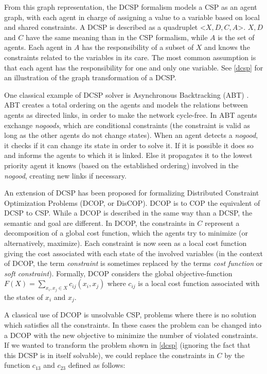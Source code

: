 From this graph representation, the DCSP formalism models a CSP as an agent graph, with each agent in charge of assigning a value to a variable based on local and shared constraints. A DCSP is described as a quadruplet <$X, D, C, A$>. $X, D$ and $C$ have the same meaning than in the CSP formalism, while $A$ is the set of agents. Each agent in $A$ has the responsibility of a subset of $X$ and knows the constraints related to the variables in its care. The most common assumption is that each agent has the responsibility for one and only one variable. See \figurename{} \ref{dcsp} for an illustration of the graph transformation of a DCSP.

One classical example of DCSP solver is Asynchronous Backtracking (ABT) \cite{Yokoo:2001:DCS:380145}. ABT creates a total ordering on the agents and models the relations between agents as directed links, in order to make the network cycle-free. In ABT agents exchange \emph{nogoods}, which are conditional constraints (the constraint is valid as long as the other agents do not change states). When an agent detects a \emph{nogood}, it checks if it can change its state in order to solve it. If it is possible it does so and informs the agents to which it is linked. Else it propagates it to the lowest priority agent it knows (based on the established ordering) involved in the \emph{nogood}, creating new links if necessary.

An extension of DCSP has been proposed for formalizing Distributed Constraint Optimization Problems (DCOP, or DisCOP). DCOP is to COP the equivalent of DCSP to CSP. While a DCOP is described in the same way than a DCSP, the semantic and goal are different.
In DCOP, the constraints in $C$ represent a decomposition of a global cost function, which the agents try to minimize (or alternatively, maximize). Each constraint is now seen as a local cost function giving the cost associated with each state of the involved variables (in the context of DCOP, the term \emph{constraint} is sometimes replaced by the terms \emph{cost function} or \emph{soft constraint}). Formally, DCOP considers the global objective-function $F(X) = \displaystyle\sum_{x_i, x_j \in X} c_{ij}(x_i,x_j)$ where $c_{ij}$ is a local cost function associated with the states of $x_i$ and $x_j$.

A classical use of DCOP is unsolvable CSP, problems where there is no solution which satisfies all the constraints. In these cases the problem can be changed into a DCOP with the new objective to minimize the number of violated constraints. If we wanted to transform the problem shown in \figurename{} \ref{dcsp} (ignoring the fact that this DCSP is in itself solvable), we could replace the constraints in $C$ by the function $c_{13}$ and $c_{23}$ defined as follows:

